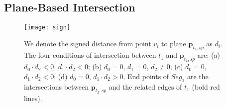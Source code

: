 
\subsection{Plane-Based Intersection}

\label{sec:embed}

\begin{figure}[t]
\centering
\texttt{[image: sign]}
\caption{We denote the signed distance from point $v_i$ to plane $\bm{p}_{t_2, sp}$ as $d_i$. The four conditions of intersection between $t_1$ and $\bm{p}_{t_2, sp}$ are:  (a) $d_0\cdot d_2<0$, $d_1\cdot d_2<0$; (b) $d_0=0$, $d_1=0$, $d_2\neq 0$; (c) $d_0=0$, $d_1\cdot d_2<0$; (d) $d_0=0$, $d_1\cdot d_2>0$. End points of $Seg_1$ are the intersections between $\bm{p}_{t_2, sp}$ and the related edges of $t_1$ (bold red lines).}
\label{fig:isect}
\end{figure}


